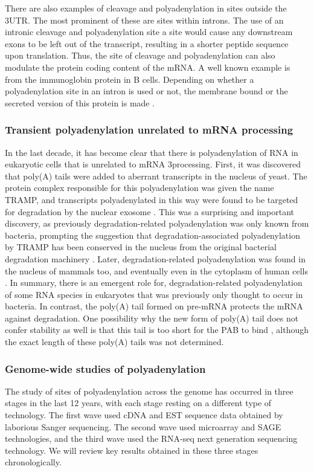 There are also examples of cleavage and polyadenylation in sites outside the
3\p UTR. The most prominent of these are sites within introns. The use of an
intronic cleavage and polyadenylation site a site would cause any downstream
exons to be left out of the transcript, resulting in a shorter peptide sequence
upon translation. Thus, the site of cleavage and polyadenylation can also
modulate the protein coding content of the mRNA. A well known example is from
the immunoglobin protein in B cells. Depending on whether a polyadenylation
site in an intron is used or not, the membrane bound or the secreted version of
this protein is made \cite{peterson_regulated_1989}.

\subsubsection{Transient polyadenylation unrelated to mRNA processing}
In the last decade, it has become clear that there is polyadenylation of
RNA in eukaryotic cells that is unrelated to mRNA 3\p processing. First, it was
discovered that poly(A) tails were added to aberrant transcripts in the nucleus
of yeast. The protein complex responsible for this polyadenylation was given
the name TRAMP, and transcripts polyadenylated in this way were found to be
targeted for degradation by the nuclear exosome \cite{lacava_rna_2005,
wyers_cryptic_2005}. This was a surprising and important discovery, as
previously degradation-related polyadenylation was only known from bacteria,
prompting the suggestion that degradation-associated polyadenylation by TRAMP
has been conserved in the nucleus from the original bacterial degradation
machinery \cite{lacava_rna_2005}. Later, degradation-related polyadenylation
was found in the nucleus of mammals too, and eventually even in the cytoplasm
of human cells \cite{slomovic_polyadenylation_2006, slomovic_addition_2010}. In
summary, there is an emergent role for, degradation-related
polyadenylation of some RNA species in eukaryotes that was previously only
thought to occur in bacteria. In contrast, the poly(A) tail formed on pre-mRNA
protects the mRNA against degradation. One possibility why the new form of
poly(A) tail does not confer stability as well is that this tail is too short
for the PAB to bind \cite{lacava_rna_2005}, although the exact length of these
poly(A) tails was not determined.

\subsubsection{Genome-wide studies of polyadenylation}
The study of sites of polyadenylation across the genome has occurred in three
stages in the last 12 years, with each stage resting on a different type of
technology. The first wave used cDNA and EST sequence data obtained by
laborious Sanger sequencing. The second wave used microarray and SAGE
technologies, and the third wave used the RNA-seq next generation sequencing
technology. We will review key results obtained in these three stages
chronologically.

